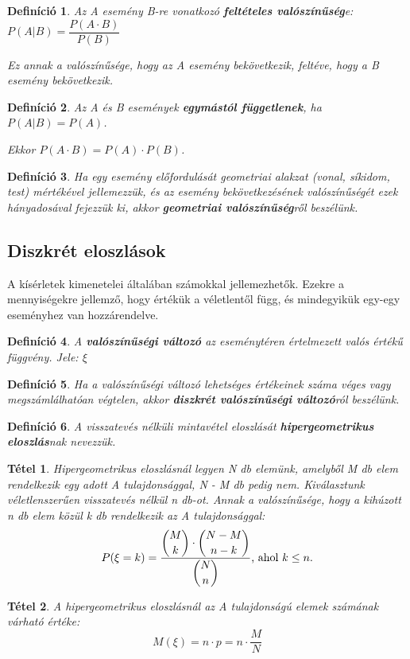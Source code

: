 \documentclass[12pt,a4paper]{article}
\newtheorem{theorem}{Tétel} [section]
\newtheorem{definition}{Definíció} [section]
\begin{document}
\begin{definition}
Az A esemény B-re vonatkozó \textbf{feltételes valószínűség}e: $P(A|B)=\dfrac{P(A\cdot B)}{P(B)}$

Ez annak a valószínűsége, hogy az A esemény bekövetkezik, feltéve, hogy a B esemény bekövetkezik.
\end{definition}

\begin{definition}
Az A és B események \textbf{egymástól függetlenek}, ha $P(A|B)=P(A)$.

Ekkor $P(A\cdot B)=P(A)\cdot P(B)$.
\end{definition}

\begin{definition}
Ha egy esemény előfordulását geometriai alakzat (vonal, síkidom, test) mértékével jellemezzük, és az esemény bekövetkezésének valószínűségét ezek hányadosával fejezzük ki, akkor \textbf{geometriai valószínűség}ről beszélünk.
\end{definition}
\subsection{Diszkrét eloszlások}
A kísérletek kimenetelei általában számokkal jellemezhetők. Ezekre a mennyiségekre jellemző, hogy értékük a véletlentől függ, és mindegyikük egy-egy eseményhez van hozzárendelve.

\begin{definition}
A \textbf{valószínűségi változó} az eseménytéren értelmezett valós értékű függvény. Jele: $\xi$
\end{definition}

\begin{definition}
Ha a valószínűségi változó lehetséges értékeinek száma véges vagy megszámlálhatóan végtelen, akkor \textbf{diszkrét valószínűségi változó}ról beszélünk.
\end{definition}

\begin{definition}
A visszatevés nélküli mintavétel eloszlását \textbf{hipergeometrikus eloszlás}nak nevezzük.
\end{definition}
\begin{theorem}
Hipergeometrikus eloszlásnál legyen N db elemünk, amelyből M db elem rendelkezik egy adott A tulajdonsággal, N - M db pedig nem. Kiválasztunk véletlenszerűen visszatevés nélkül n db-ot. Annak a valószínűsége, hogy a kihúzott n db elem közül k db rendelkezik az A tulajdonsággal:
\[P(\xi =k)=\dfrac{\displaystyle\binom{M}{k}\cdot \displaystyle\binom{N-M}{n-k}}{\displaystyle\binom{N}{n}} \text{\normalfont , ahol } k\leq n.\]
\end{theorem}
\begin{theorem}
A hipergeometrikus eloszlásnál az A tulajdonságú elemek számának várható értéke:
\[M(\xi)=n\cdot p=n\cdot\dfrac{M}{N}\]
\end{theorem}
\end{document}
